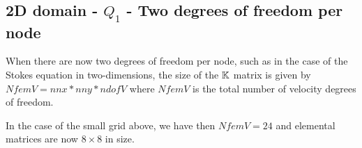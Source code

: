 \subsection{2D domain - $Q_1$ - Two degrees of freedom per node}

When there are now two degrees of freedom per node, such as in the case 
of the Stokes equation in two-dimensions, the size of the ${\mathbb{K}}$ matrix 
is given by $NfemV=nnx*nny*ndofV$ where $NfemV$ is the total number of 
velocity degrees of freedom.

\begin{center}

\end{center}

In the case of the small grid above, we have then $NfemV=24$ and
elemental matrices are now $8\times8$ in size.

